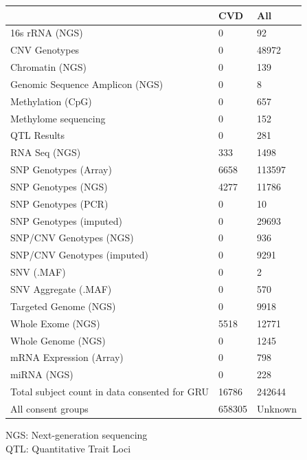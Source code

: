 \documentclass[letter]{bioinfo}
\begin{document}
	\begin{table}[]
{\begin{tabular}{l l l}
			\toprule
			& \textbf{CVD} &  \textbf{All}                         \\ \midrule
			16s rRNA (NGS)                 &     0 &      92 \\
			CNV Genotypes                  &     0 &   48972 \\
			Chromatin (NGS)                &     0 &     139 \\
			Genomic Sequence Amplicon (NGS)&     0 &       8 \\
			Methylation (CpG)              &     0 &     657 \\
			Methylome sequencing           &     0 &     152 \\
			QTL Results                    &     0 &     281 \\
			RNA Seq (NGS)                  &   333 &    1498 \\
			SNP Genotypes (Array)          &  6658 &  113597 \\
			SNP Genotypes (NGS)            &  4277 &   11786 \\
			SNP Genotypes (PCR)            &     0 &      10 \\
			SNP Genotypes (imputed)        &     0 &   29693 \\
			SNP/CNV Genotypes (NGS)        &     0 &     936 \\
			SNP/CNV Genotypes (imputed)    &     0 &    9291 \\
			SNV (.MAF)                     &     0 &       2 \\
			SNV Aggregate (.MAF)           &     0 &     570 \\
			Targeted Genome (NGS)          &     0 &    9918 \\
			Whole Exome (NGS)              &  5518 &   12771 \\
			Whole Genome (NGS)             &     0 &    1245 \\
			mRNA Expression (Array)        &     0 &     798 \\
			miRNA (NGS)                        & 0 &   228 \\ \hline
			Total subject count in data consented for GRU & 16786 & 242644 \\ \hline
			All consent groups & 658305 & Unknown \\	
		\end{tabular}}{NGS: Next-generation sequencing\\ QTL: Quantitative Trait Loci}
	\end{table}
	
\end{document}
